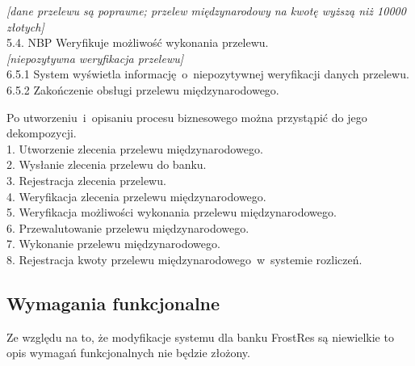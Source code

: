 \begin{flushleft}
\textit{{[}dane przelewu są poprawne; przelew międzynarodowy na kwotę wyższą niż 10000 złotych{]}}\\
\hspace{1ex}5.4. NBP Weryfikuje możliwość wykonania przelewu.\\
\hspace{1ex}\textit{{[}niepozytywna weryfikacja przelewu{]}}\\
\hspace{2ex}6.5.1 System wyświetla informację~o~niepozytywnej weryfikacji danych przelewu.\\
\hspace{2ex}6.5.2 Zakończenie obsługi przelewu międzynarodowego.\\ 
\end{flushleft}

\begin{flushleft}
Po utworzeniu~i~opisaniu procesu biznesowego można przystąpić do jego dekompozycji. \\
\hspace{1ex}1. Utworzenie zlecenia przelewu międzynarodowego.\\
\hspace{1ex}2. Wysłanie zlecenia przelewu do banku.\\
\hspace{1ex}3. Rejestracja zlecenia przelewu.\\
\hspace{1ex}4. Weryfikacja zlecenia przelewu międzynarodowego.\\
\hspace{1ex}5. Weryfikacja możliwości wykonania przelewu międzynarodowego.\\
\hspace{1ex}6. Przewalutowanie przelewu międzynarodowego.\\
\hspace{1ex}7. Wykonanie przelewu międzynarodowego.\\
\hspace{1ex}8. Rejestracja kwoty przelewu międzynarodowego~w~systemie rozliczeń.\\
\end{flushleft}

\subsection*{Wymagania funkcjonalne}
Ze względu na to, że modyfikacje systemu dla banku FrostRes są niewielkie to opis wymagań funkcjonalnych nie będzie złożony. 

